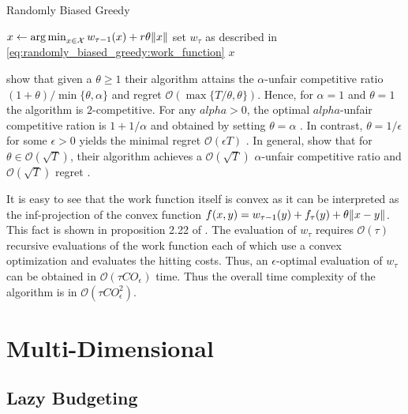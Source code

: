 \begin{algorithm}
    \caption{Randomly Biased Greedy \cite{Andrew2015}}\label{alg:ud:rbg}
    $x \gets \operatorname*{arg\,min}_{x \in \mathcal{X}} w_{\tau-1}(x) + r \theta \lVert x\rVert$\;
    set $w_{\tau}$ as described in \autoref{eq:randomly_biased_greedy:work_function}\;
    \Return $x$\;
\end{algorithm}

\citeauthor*{Andrew2015} show that given a $\theta \geq 1$ their algorithm attains the $\alpha$-unfair competitive ratio $(1+\theta) / \min \{\theta, \alpha\}$ and regret $\mathcal{O}(\max \{T / \theta, \theta\})$. Hence, for $\alpha = 1$ and $\theta = 1$ the algorithm is $2$-competitive. For any $alpha > 0$, the optimal $alpha$-unfair competitive ration is $1 + 1 / \alpha$ and obtained by setting $\theta = \alpha$ \cite{Andrew2015}. In contrast, $\theta = 1 / \epsilon$ for some $\epsilon > 0$ yields the minimal regret $\mathcal{O}(\epsilon T)$ \cite{Andrew2015}. In general, \citeauthor*{Andrew2015} show that for $\theta \in \mathcal{O}(\sqrt{T})$, their algorithm achieves a $\mathcal{O}(\sqrt{T})$ $\alpha$-unfair competitive ratio and $\mathcal{O}(\sqrt{T})$ regret \cite{Andrew2015}.

It is easy to see that the work function itself is convex as it can be interpreted as the inf-projection of the convex function $f(x,y) = w_{\tau-1}(y) + f_{\tau}(y) + \theta \lVert x - y\rVert$. This fact is shown in proposition 2.22 of \cite{Burke2015}. The evaluation of $w_{\tau}$ requires $\mathcal{O}(\tau)$ recursive evaluations of the work function each of which use a convex optimization and evaluates the hitting costs. Thus, an $\epsilon$-optimal evaluation of $w_{\tau}$ can be obtained in $\mathcal{O}(\tau C O_{\epsilon})$ time. Thus the overall time complexity of the algorithm is in $\mathcal{O}(\tau C O_{\epsilon}^2)$.

\section{Multi-Dimensional}\label{section:online_algorithms:md}

\subsection{Lazy Budgeting}\label{section:online_algorithms:md:lazy_budgeting}

